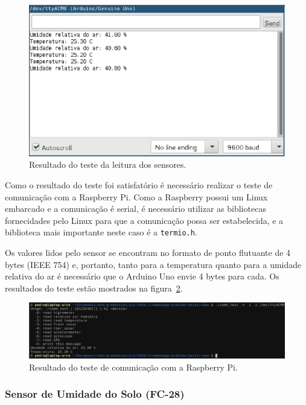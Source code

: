 		\begin{figure}[!htbp]
		\begin{center}
		\includegraphics[width=.7\textwidth]{figuras/am2302_arduino.eps}
		\caption{\label{fig:am2302ardu}Resultado do teste da leitura dos sensores.}
		\end{center}
		\end{figure}

		Como o resultado do teste foi satisfatório é necessário realizar
		o teste de comunicação com a Raspberry Pi. Como a Raspberry possui
		um Linux embarcado e a comunicação é serial, é necessário utilizar
		as bibliotecas fornecidades pelo Linux para que a comunicação
		possa ser estabelecida, e a biblioteca mais importante neste caso
		é a \texttt{termio.h}.
		
		Os valores lidos pelo sensor se encontram no formato de ponto flutuante
		de 4 bytes (IEEE 754) e, portanto, tanto para a temperatura quanto
		para a umidade relativa do ar é necessário que o Arduino Uno envie
		4 bytes para cada. Os resultados do teste estão mostrados na figura~\ref{fig:am2302rasp}.

		\begin{figure}[!htbp]
		\begin{center}
		\includegraphics[width=\textwidth]{figuras/am2302_raspberry.eps}
		\caption{\label{fig:am2302rasp}Resultado do teste de comunicação com a Raspberry Pi.}
		\end{center}
		\end{figure}

	\subsubsection{Sensor de Umidade do Solo (FC-28)}

